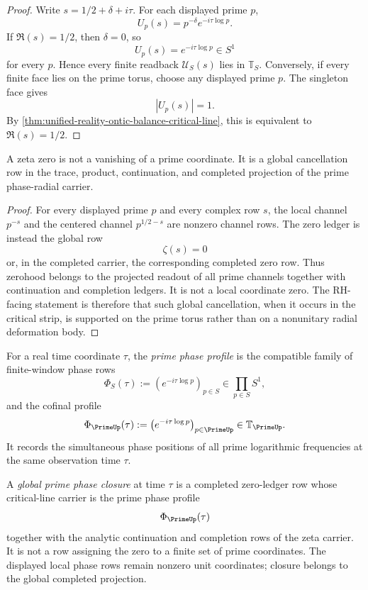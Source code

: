 \begin{proof}
Write $s=1/2+\delta+i\tau$.  For each displayed prime $p$,
$$
U_p(s)=p^{-\delta}e^{-i\tau\log p}.
$$
If $\Re(s)=1/2$, then $\delta=0$, so
$$
U_p(s)=e^{-i\tau\log p}\in S^1
$$
for every $p$.  Hence every finite readback $\mathcal U_S(s)$ lies in
$\mathbb T_S$.  Conversely, if every finite face lies on the prime
torus, choose any displayed prime $p$.  The singleton face gives
$$
|U_p(s)|=1.
$$
By \autoref{thm:unified-reality-ontic-balance-critical-line}, this is
equivalent to $\Re(s)=1/2$.
\end{proof}

\begin{theorem}
\label{thm:unified-reality-zeta-zeros-projected-global-cancellations}
A zeta zero is not a vanishing of a prime coordinate.  It is a global
cancellation row in the trace, product, continuation, and completed
projection of the prime phase-radial carrier.
\end{theorem}

\begin{proof}
For every displayed prime $p$ and every complex row $s$, the local
channel $p^{-s}$ and the centered channel $p^{1/2-s}$ are nonzero
channel rows.  The zero ledger is instead the global row
$$
\zeta(s)=0
$$
or, in the completed carrier, the corresponding completed zero row.
Thus zerohood belongs to the projected readout of all prime channels
together with continuation and completion ledgers.  It is not a local
coordinate zero.  The RH-facing statement is therefore that such global
cancellation, when it occurs in the critical strip, is supported on the
prime torus rather than on a nonunitary radial deformation body.
\end{proof}

\begin{definition}
\label{def:unified-reality-prime-phase-profile}
For a real time coordinate $\tau$, the \emph{prime phase profile} is the
compatible family of finite-window phase rows
$$
\Phi_S(\tau)
:=
\left(e^{-i\tau\log p}\right)_{p\in S}
\in
\prod_{p\in S}S^1,
$$
and the cofinal profile
$$
\Phi_{\PrimeUp}(\tau)
:=
\left(e^{-i\tau\log p}\right)_{p\in\PrimeUp}
\in
\mathbb T_{\PrimeUp}.
$$
It records the simultaneous phase positions of all prime logarithmic
frequencies at the same observation time $\tau$.
\end{definition}

\begin{definition}
\label{def:unified-reality-global-prime-phase-closure}
A \emph{global prime phase closure} at time $\tau$ is a completed
zero-ledger row whose critical-line carrier is the prime phase profile
$$
\Phi_{\PrimeUp}(\tau)
$$
together with the analytic continuation and completion rows of the zeta
carrier.  It is not a row assigning the zero to a finite set of prime
coordinates.  The displayed local phase rows remain nonzero unit
coordinates; closure belongs to the global completed projection.
\end{definition}

